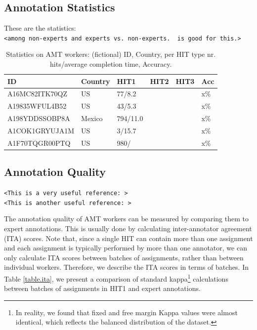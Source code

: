\documentclass[11pt,letterpaper]{article}
\begin{document}
\subsection{Annotation Statistics}

These are the statistics:\\
\texttt{<among non-experts and experts vs. non-experts. \cite{snow_cheap_2008} is good for this.>}

\begin{table}
\begin{scriptsize}
\begin{tabular}{|l|l|l|l|l|l|}
 \hline
 ID & Country & HIT1 & HIT2 & HIT3 & Acc \\ \hline
 A16MC82ITK70QZ & US & 77/8.2 &  &  & x\% \\
 A19835WFUL4B52 & US & 43/5.3 &  &  & x\% \\
 A198YDDSSOBP8A & Mexico & 794/11.0 &  &  & x\% \\
 A1COK1GRYUJA1M & US & 3/15.7 &  &  & x\% \\
 A1F70TQGR00PTQ & US & 980/ &  &  & x\% \\
 \hline
\end{tabular}
\end{scriptsize}
\caption{\small Statistics on AMT workers: (fictional) ID, Country, per HIT type nr. hits/average completion time, Accuracy.}
\label{table.stats}
\end{table}

\subsection{Annotation Quality}
\texttt{<This is a very useful reference: \cite{dawid_maximum_1979}>} \\
\texttt{<This is another useful reference: \cite{mason_financial_2009}>}

The annotation quality of AMT workers can be measured by comparing them to expert annotations. This is usually done by calculating inter-annotator agreement (ITA) scores. Note that, since a single HIT can contain more than one assignment and each assignment is typically performed by more than one annotator, we can only calculate ITA scores between batches of assignments, rather than between individual workers. Therefore, we describe the ITA scores in terms of batches. In Table \ref{table.ita}, we present a comparison of standard kappa\footnote{In reality, we found that fixed and free margin Kappa values were almost identical, which reflects the balanced distribution of the dataset.} calculations \cite{eugenio_kappa_2004} between batches of assignments in HIT1 and expert annotations.
\end{document}
